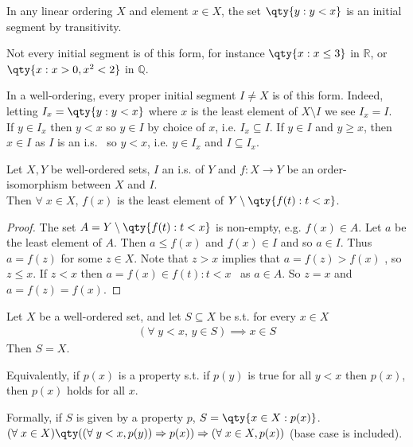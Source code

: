 \begin{remark}
    In any linear ordering $X$ and element $x \in X$, the set $\qty{y : y < x}$ is an initial segment by transitivity.

    Not every initial segment is of this form, for instance $\qty{x : x \leq 3}$ in $\mathbb R$, or $\qty{x : x > 0, x^2 < 2}$ in $\mathbb Q$.
\end{remark}

\begin{remark}
    In a well-ordering, every proper initial segment $I \neq X$ is of this form.
    Indeed, letting $I_x = \qty{y : y < x}$ where $x$ is the least element of $X \setminus I$ we see $I_x = I$. \\
    If $y \in I_x$ then $y < x$ so $y \in I$ by choice of $x$, i.e. $I_x \subseteq I$.
    If $y \in I$ and $y \geq x$, then $x \in I$ as $I$ is an i.s. \Lightning \ so $y < x$, i.e. $y \in I_x$ and $I \subseteq I_x$.
\end{remark}

\begin{lemma}
    Let $X, Y$ be well-ordered sets, $I$ an i.s. of $Y$ and $f : X \to Y$ be an order-isomorphism between $X$ and $I$. \\
    Then $\forall \; x \in X$, $f(x)$ is the least element of $Y \setminus \qty{f(t) : t < x}$.
\end{lemma}

\begin{proof}
    The set $A = Y \setminus \qty{f(t) : t < x}$ is non-empty, e.g. $f(x) \in A$.
    Let $a$ be the least element of $A$.
    Then $a \leq f(x)$ and $f(x) \in I$ and so $a \in I$.
    Thus $a = f(z)$ for some $z \in X$.
    Note that $z > x$ implies that $a = f(z) > f(x)$ \Lightning, so $z \leq x$.
    If $z < x$ then $a = f(x) \in {f(t) : t < x}$ \Lightning \ as $a \in A$.
    So $z = x$ and $a = f(z) = f(x)$.
\end{proof}

\begin{proposition}
    Let $X$ be a well-ordered set, and let $S \subseteq X$ be s.t. for every $x \in X$
    \begin{align*}
    (\forall \; y < x,\, y \in S) \implies x \in S
    \end{align*}
    Then $S = X$.
\end{proposition}

\begin{remark}
    Equivalently, if $p(x)$ is a property s.t. if $p(y)$ is true for all $y < x$ then $p(x)$, then $p(x)$ holds for all $x$.

    Formally, if $S$ is given by a property $p$, $S = \qty{x \in X : p(x)}$. \\
    $(\forall \; x \in X)\qty((\forall \; y < x, p(y)) \implies p(x)) \implies (\forall \; x \in X, p(x))$ (base case is included).
\end{remark}

